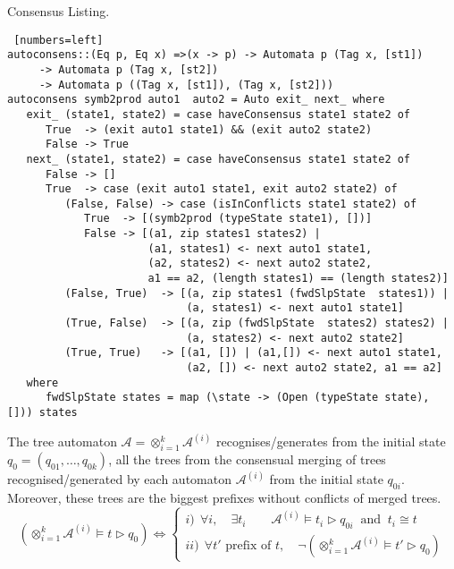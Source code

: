 	
\begin{algorithm}
\small
\caption{Consensus Listing.}
\label{listingConsensus}
\begin{Verbatim} [numbers=left]
autoconsens::(Eq p, Eq x) =>(x -> p) -> Automata p (Tag x, [st1])
     -> Automata p (Tag x, [st2]) 
     -> Automata p ((Tag x, [st1]), (Tag x, [st2]))
autoconsens symb2prod auto1  auto2 = Auto exit_ next_ where 
   exit_ (state1, state2) = case haveConsensus state1 state2 of
      True  -> (exit auto1 state1) && (exit auto2 state2) 
      False -> True
   next_ (state1, state2) = case haveConsensus state1 state2 of
      False -> []
      True  -> case (exit auto1 state1, exit auto2 state2) of
         (False, False) -> case (isInConflicts state1 state2) of
            True  -> [(symb2prod (typeState state1), [])]   
            False -> [(a1, zip states1 states2) | 
                      (a1, states1) <- next auto1 state1,
                      (a2, states2) <- next auto2 state2,
                      a1 == a2, (length states1) == (length states2)]
         (False, True)  -> [(a, zip states1 (fwdSlpState  states1)) |
                            (a, states1) <- next auto1 state1]
         (True, False)  -> [(a, zip (fwdSlpState  states2) states2) |
                            (a, states2) <- next auto2 state2]
         (True, True)   -> [(a1, []) | (a1,[]) <- next auto1 state1,
                            (a2, []) <- next auto2 state2, a1 == a2]
   where 
      fwdSlpState states = map (\state -> (Open (typeState state), [])) states
\end{Verbatim}
\end{algorithm}

\begin{proposition}
The tree automaton $\mathcal{A}=\otimes_{i=1}^{k}\mathcal{A}^{(i)}$  recognises/generates from the initial state $q_0 = (q_{01}, \ldots , q_{0k})$, all the trees from the consensual merging of trees recognised/generated by each automaton $\mathcal{A}^{(i)}$ from the initial state $q_{0i}$. Moreover, these trees are the biggest prefixes without conflicts of merged trees.
\[
\left( \otimes_{i=1}^{k}\mathcal{A}^{(i)} \models t \triangleright q_0\right) \Leftrightarrow 
  \left\{\begin{array}{l}
	i) ~~ \forall i,\quad\exists t_i\qquad  \mathcal{A}^{(i)}\models t_i \triangleright q_{0i}~\mbox{ and } ~t_i\cong t\\
	ii) ~~\forall t' \mbox{ prefix of } t, \quad \neg \left( \otimes_{i=1}^{k}\mathcal{A}^{(i)} \models t' \triangleright q_0\right)
	\end{array}\right.
\]
\end{proposition}

